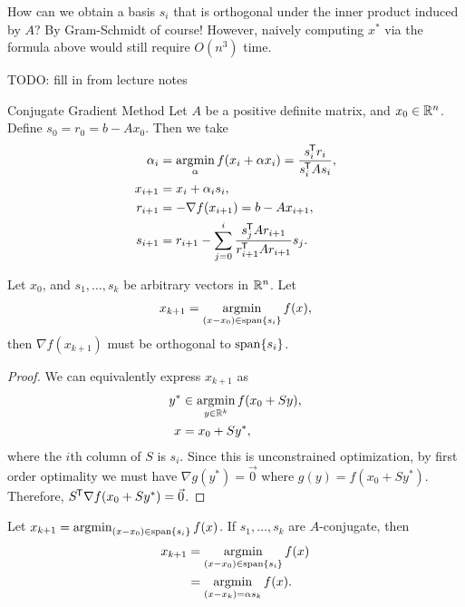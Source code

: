 How can we obtain a basis $s_i$ that is orthogonal under the inner product induced by $A$? By Gram-Schmidt of course! However, naively computing $x^*$ via the formula above would still require $O(n^3)$ time.

\begin{lemma}
    {\color{red}TODO: fill in from lecture notes}
\end{lemma}

\begin{defn}{Conjugate Gradient Method}\proofbreak
    Let $A$ be a positive definite matrix, and $x_0 \in \mathbb{R}^n$. Define $s_0 = r_0 = b - Ax_0$. Then we take
    \begin{align*}
        \alpha_i &= \operatorname*{argmin}_{\alpha}f(x_i + \alpha x_i) = \frac{s_i^{\mkern-1.5mu\mathsf{T}}r_i}{s_i^{\mkern-1.5mu\mathsf{T}}As_i}, \\
        x_{i+1} &= x_i + \alpha_is_i, \\
        r_{i+1} &= -\nabla f(x_{i+1}) = b - Ax_{i+1}, \\
        s_{i+1} &= r_{i+1} - \sum_{j=0}^i\frac{s_j^{\mkern-1.5mu\mathsf{T}}Ar_{i+1}}{r_{i+1}^{\mkern-1.5mu\mathsf{T}}Ar_{i+1}}s_j.
    \end{align*}
\end{defn}

\begin{lemma}\label{lemma:conjugate-gradient-1}
    Let $x_0$, and $s_1, \ldots, s_k$ be arbitrary vectors in $\mathbb{R}^n$. Let
    \begin{align*}
        x_{k+1} = \operatorname*{argmin}_{(x-x_0) \in \operatorname{span}\{s_i\}}f(x),
    \end{align*}
    then $\nabla f(x_{k+1})$ must be orthogonal to $\operatorname{span}\{s_i\}$.
\end{lemma}

\begin{proof}
    We can equivalently express $x_{k+1}$ as
    \begin{align*}
        y^* &\in \operatorname*{argmin}_{y \in \mathbb{R}^k}f(x_0 + Sy), \\
        x &= x_0 + Sy^*,
    \end{align*}
    where the $i$th column of $S$ is $s_i$. Since this is unconstrained optimization, by first order optimality we must have $\nabla g(y^*) = \vec{0}$ where $g(y) = f(x_0 + Sy^*)$. Therefore, $S^{\mkern-1.5mu\mathsf{T}}\nabla f(x_0 + Sy^*) = \vec{0}$.
\end{proof}

\begin{lemma}\label{lemma:conjugate-gradient-2}
    Let $x_{k+1} = \operatorname*{argmin}_{(x-x_0) \in \operatorname{span}\{s_i\}}f(x)$. If $s_1, \ldots, s_k$ are $A$-conjugate, then
    \begin{align*}
        x_{k+1} &= \operatorname*{argmin}_{(x-x_0) \in \operatorname{span}\{s_i\}}f(x) \\
        &= \operatorname*{argmin}_{(x-x_k) = \alpha s_{k}}f(x).
    \end{align*}
\end{lemma}

